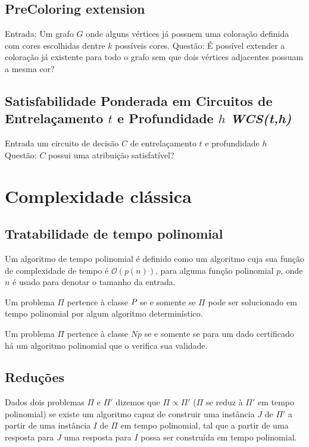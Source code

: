 \subsection{PreColoring extension}
\begin{definition}
 Entrada: Um grafo $G$ onde alguns vértices já possuem uma coloração definida com cores escolhidas dentre $k$ possíveis cores.
 Questão: É possível extender a coloração já existente para todo o grafo sem que dois vértices adjacentes possuam a mesma cor? 
\end{definition}

\subsection{Satisfabilidade Ponderada em Circuitos de Entrelaçamento $t$ e Profundidade $h$ \emph{WCS(t,h)}}
\begin{definition}
 Entrada um circuito de decisão $C$ de entrelaçamento $t$ e profundidade $h$\\
 Questão: $C$ possui uma atribuição satisfatível?
\end{definition}

\section{Complexidade clássica}
\subsection{Tratabilidade de tempo polinomial}
Um algoritmo de tempo polinomial é definido como um algoritmo cuja sua função de complexidade de tempo é $\mathcal{O}(p(n))$, para alguma função polinomial $p$, onde $n$ é usado para denotar o tamanho da entrada.

Um problema $\Pi$ pertence à classe $\P$ se e somente se $\Pi$ pode ser solucionado em tempo polinomial por algum algoritmo determinístico.

Um problema $\Pi$ pertence à classe $\textit{Np}$ se e somente se para um dado certificado há um algoritmo polinomial que o verifica sua validade.

\subsection{Reduções}
Dados dois problemas $\Pi$ e $\Pi'$ dizemos que $\Pi \propto \Pi'$ ($\Pi$ se reduz à $\Pi'$ em tempo polinomial) se existe um algoritmo capaz de construir uma instância $J$ de $\Pi'$ a partir de uma instância $I$ de $\Pi$ em tempo polinomial, tal que a partir de uma resposta para $J$ uma resposta para $I$ possa ser construída em tempo polinomial. 

